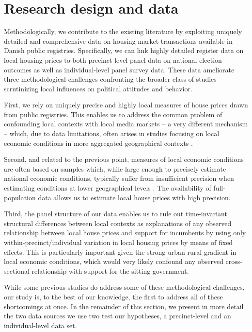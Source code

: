 \documentclass[12pt,a4paper]{article}
\begin{document}
	\section{Research design and data}\label{resdesign}
	
	Methodologically, we contribute to the existing literature by exploiting uniquely detailed and comprehensive data on housing market transactions available in Danish public registries. Specifically, we can link highly detailed register data on local housing prices to both precinct-level panel data on national election outcomes as well as individual-level panel survey data. These data ameliorate three methodological challenges confronting the broader class of studies scrutinizing local influences on political attitudes and behavior.
	
	First, we rely on uniquely precise and highly local measures of house prices drawn from public registries. This enables us to address the common problem of confounding local contexts with local media markets -- a very different mechanism -- which, due to data limitations, often arises in studies focusing on local economic conditions in more aggregated geographical contexts \citep[][]{bisgaard2016reconsidering}.  
	
	Second, and related to the previous point, measures of local economic conditions are often based on samples which, while large enough to precisely estimate national economic conditions, typically suffer from insufficient precision when estimating conditions at lower geographical levels \citep[][]{healy2014presidential}. The availability of full-population data allows us to estimate local house prices with high precision.
	
	Third, the panel structure of our data enables us to rule out time-invariant structural differences between local contexts as explanations of any observed relationship between local house prices and support for incumbents by using only within-precinct/individual variation in local housing prices by means of fixed effects. This is particularly important given the strong urban-rural gradient in local economic conditions, which would very likely confound any observed cross-sectional relationship with support for the sitting government.
	
	While some previous studies do address some of these methodological challenges, our study is, to the best of our knowledge, the first to address all of these shortcomings at once. In the remainder of this section, we present in more detail the two data sources we use two test our hypotheses, a precinct-level and an individual-level data set.
	
\end{document}
